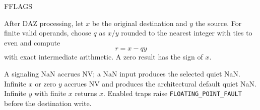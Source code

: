 \begin{manualflageffects}{FFLAGS}
\end{manualflageffects}

After DAZ processing, let \(x\) be the original destination and \(y\) the source. For finite valid operands, choose \(q\) as \(x/y\) rounded to the nearest integer with ties to even and compute
\[
  r = x - qy
\]
with exact intermediate arithmetic. A zero result has the sign of \(x\).

A signaling NaN accrues NV; a NaN input produces the selected quiet NaN. Infinite \(x\) or zero \(y\) accrues NV and produces the architectural default quiet NaN. Infinite \(y\) with finite \(x\) returns \(x\). Enabled traps raise \texttt{FLOATING\_POINT\_FAULT} before the destination write.
